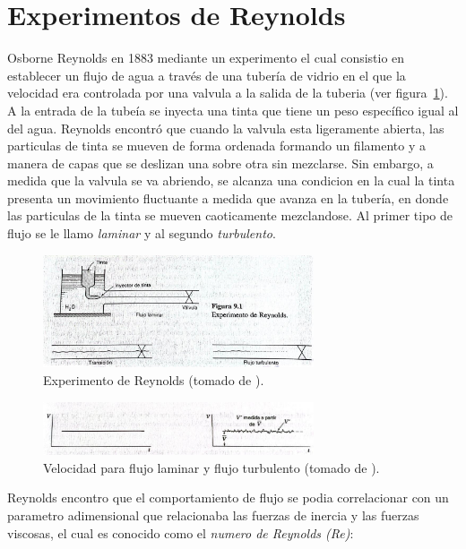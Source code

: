 \documentclass[10pt, oneside]{article}
\begin{document}
\section{Experimentos de Reynolds}
Osborne Reynolds en 1883 mediante un experimento el cual consistio en establecer un flujo de agua a trav\'es de una tuber\'ia de vidrio en el que la velocidad era controlada por una valvula a la salida de la tuberia (ver figura~\ref{reyn}). A la entrada de la tube\'ia se inyecta una tinta que tiene un peso espec\'ifico igual al del agua. Reynolds encontr\'o que cuando la valvula esta ligeramente abierta, las particulas de tinta se mueven de forma ordenada formando un filamento y a manera de capas que se deslizan una sobre otra sin mezclarse. Sin embargo, a medida que la valvula se va abriendo, se alcanza una condicion en la cual la tinta presenta un movimiento fluctuante a medida que avanza en la tuber\'ia, en donde las particulas de la tinta se mueven caoticamente mezclandose. Al primer tipo de flujo se le llamo \emph{laminar} y al segundo \emph{turbulento}.

\begin{figure}[h]
\centering
\includegraphics[width=8cm]{reyn.jpeg}
\caption{Experimento de Reynolds (tomado de \cite{irving2010fluid}).}
\label{reyn}
\end{figure}

\begin{figure}[h]
\centering
\includegraphics[width=8cm]{reyn1.jpeg}
\caption{Velocidad para flujo laminar y flujo turbulento (tomado de \cite{irving2010fluid}).}
\label{reyn1}
\end{figure}

Reynolds encontro que el comportamiento de flujo se podia correlacionar con un parametro adimensional que relacionaba las fuerzas de inercia y las fuerzas viscosas, el cual es conocido como el \emph{numero de Reynolds (Re)}:
\end{document}
